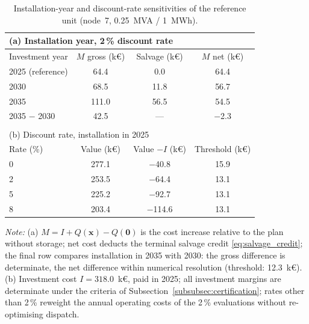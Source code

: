 \documentclass[preprint,12pt]{elsarticle}
\providecommand{\DIFaddbegin}{} %
\providecommand{\DIFaddend}{} %
\providecommand{\DIFdelend}{} %
\begin{document}
\DIFdelend \DIFaddbegin \begin{table}[htbp!]
    \centering
    \caption{Installation-year and discount-rate sensitivities of the reference unit (node~7, 0.25~MVA / 1~MWh).}
    \label{tab:res_year_ladder}
    \footnotesize\setlength{\tabcolsep}{5pt}
    \begin{tabular}{l c c c}
        \multicolumn{4}{l}{(a) Installation year, 2\,\% discount rate} \\
        \toprule
        Investment year & $M$ gross (k\euro) & Salvage (k\euro) & $M$ net (k\euro) \\
        \midrule
        2025 (reference) & 64.4  & 0.0  & 64.4 \\
        2030             & 68.5  & 11.8 & 56.7 \\
        2035             & 111.0 & 56.5 & 54.5 \\
        2035 $-$ 2030    & 42.5  & ---  & $-$2.3 \\
        \bottomrule
        \multicolumn{4}{c}{} \\
        \multicolumn{4}{l}{(b) Discount rate, installation in 2025} \\
        \toprule
        Rate (\%) & Value (k\euro) & Value $- I$ (k\euro) & Threshold (k\euro) \\
        \midrule
        0 & 277.1 & $-$40.8  & 15.9 \\
        2 & 253.5 & $-$64.4  & 13.1 \\
        5 & 225.2 & $-$92.7  & 13.1 \\
        8 & 203.4 & $-$114.6 & 13.1 \\
        \bottomrule
    \end{tabular}
    \par\smallskip
    \begin{minipage}{\linewidth}
        \footnotesize\raggedright
        \textit{Note:}
        (a) $M = I + Q(\boldsymbol{x}) - Q(\boldsymbol{0})$ is the cost increase relative to the plan without storage; net cost deducts the terminal salvage credit \eqref{eq:salvage_credit}; the final row compares installation in 2035 with 2030: the gross difference is determinate, the net difference within numerical resolution (threshold: 12.3~k\euro{}).
        (b) Investment cost $I=318.0$~k\euro{}, paid in 2025; all investment margins are determinate under the criteria of Subsection~\ref{subsubsec:certification}; rates other than 2\,\% reweight the annual operating costs of the 2\,\% evaluations without re-optimising dispatch.
    \end{minipage}
\end{table}
\DIFaddend 
\end{document}
